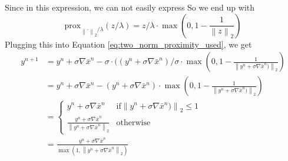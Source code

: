 \documentclass{paper}
\newcommand{\prox}{\text{prox}}
\newcommand{\twonorm}[1]{\left\lVert#1\right\rVert_2}
\begin{document}
Since in this expression, we can not easily express 
So we end up with
\begin{equation}
	\prox_{\twonorm{\cdot} / \lambda}(z / \lambda) =
	z / \lambda \cdot \max \left(0 , 1 - \frac{1}{\twonorm{z}} \right)
\end{equation}
Plugging this into Equation \eqref{eq:two_norm_proximity_used}, we get
\begin{align}
	y^{n+1} &= y^n + \sigma \nabla \bar{x}^n - 
			   \sigma \cdot ((y^n + \sigma \nabla \bar{x}^n) / \sigma \cdot
			   \max \left(0, 1 - \frac{1}{\twonorm{y^n + \sigma \nabla \bar{x}^n)}} \right) \\
			&= y^n + \sigma \nabla \bar{x}^n - 
			   (y^n + \sigma \nabla \bar{x}^n) \cdot
			   \max \left(0, 1 - \frac{1}{\twonorm{y^n + \sigma \nabla \bar{x}^n)}} \right) \\
			&= \begin{cases}
   				y^n + \sigma \nabla \bar{x}^n  			
   						& \text{if} \twonorm{y^n + \sigma \nabla \bar{x}^n)} \leq 1 \\
   				\frac{y^n + \sigma \nabla \bar{x}^n}
				    {\twonorm{y^n + \sigma \nabla \bar{x}^n}}      
				    		& \text{otherwise}
  			 \end{cases} \\
			&= \frac{y^n + \sigma \nabla \bar{x}^n}
				    {\max \left(1, \twonorm{y^n + \sigma \nabla \bar{x}^n}\right)}
\end{align}
\end{document}
